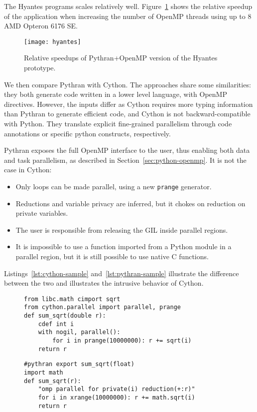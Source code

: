 \documentclass{llncs}
\begin{document}
The Hyantes programs scales relatively well. Figure~\ref{fig:hyantes-speedup} shows
the relative speedup of the application when increasing the number of OpenMP
threads using up to 8 AMD Opteron 6176 SE.

\begin{figure}[ht]
    \caption{Relative speedups of Pythran+OpenMP version of the Hyantes prototype.}
    \label{fig:hyantes-speedup}
    \centering
    \texttt{[image: hyantes]}
\end{figure}

We then compare Pythran with Cython. The approaches share some similarities:
they both generate code written in a lower level language, with OpenMP
directives. However, the inputs differ as Cython requires more typing
information than Pythran to generate efficient code, and Cython is not
backward-compatible with Python. They translate explicit fine-grained
parallelism through code annotations or specific python constructs,
respectively.

Pythran exposes the full OpenMP interface to the user, thus enabling both data
and task parallelism, as described in Section~\ref{sec:python-openmp}. It is
not the case in Cython:
%
\begin{itemize}

    \item Only loops can be made parallel, using a new \texttt{prange} generator.

    \item Reductions and variable privacy are inferred, but it chokes on
        reduction on private variables.

    \item The user is responsible from releasing the GIL inside parallel
        regions.

    \item It is impossible to use a function imported from a Python module in a
        parallel region, but it is still possible to use native C functions.

\end{itemize}
%
Listings~\ref{lst:cython-sample} and~\ref{lst:pythran-sample} illustrate the
difference between the two and illustrates the intrusive behavior of Cython.

\begin{figure}

    \begin{lstlisting}[label={lst:cython-sample}, caption={Cython implementation
    of a parallel reduction.}]
from libc.math cimport sqrt
from cython.parallel import parallel, prange
def sum_sqrt(double r):
    cdef int i
    with nogil, parallel():
        for i in prange(10000000): r += sqrt(i)
    return r
    \end{lstlisting}
%
    \begin{lstlisting}[label={lst:pythran-sample}, caption={Pythran implementation
    of a parallel reduction.}]
#pythran export sum_sqrt(float)
import math
def sum_sqrt(r):
    "omp parallel for private(i) reduction(+:r)"
    for i in xrange(10000000): r += math.sqrt(i)
    return r
    \end{lstlisting}
\end{figure}
\end{document}
